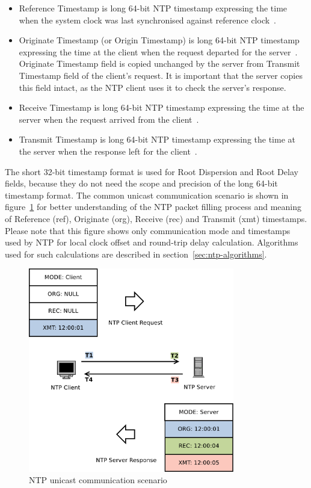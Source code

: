 \begin{itemize}
to increase its polling interval.
For stratum 1, this is a four-octet, left-justified, zero-padded ASCII
string assigned to the reference clock (e.g. "GPS" when synchronising against Global Position System clock).
Above stratum 1, this is the reference identifier of the server used for synchronisation
and can be used by the client together with stratum field to detect loops in the NTP hierarchy.
If communicating over IPv4, the identifier is IPv4 address.
If communicating over IPv6, it is the first four octets of the MD5 hash of the IPv6 address~\cite{rfc5905}.
\item
Reference Timestamp is long 64-bit NTP timestamp expressing the time
when the system clock was last synchronised against reference clock~\cite{rfc5905}.
\item
Originate Timestamp (or Origin Timestamp) is long 64-bit NTP timestamp expressing the time
at the client when the request departed for the server~\cite{rfc5905}.
Originate Timestamp field is copied
unchanged by the server from Transmit Timestamp field of the client's request.
It is important that the server copies this field intact,
as the NTP client uses it to check the server's response.
\item
Receive Timestamp is long 64-bit NTP timestamp expressing the time
at the server when the request arrived from the client~\cite{rfc5905}.
\item
Transmit Timestamp is long 64-bit NTP timestamp expressing the time
at the server when the response left for the client~\cite{rfc5905}.
\end{itemize}

The short 32-bit timestamp format is used for Root Dispersion and Root Delay fields,
because they do not need the scope and precision of the long 64-bit timestamp format.
The common unicast communication scenario is shown in figure~\ref{fig:ntp-client-server}
for better understanding of the NTP packet filling process and meaning of
Reference (ref), Originate (org), Receive (rec) and Transmit (xmt) timestamps.
Please note that this figure shows only communication mode and
timestamps used by NTP for local clock offset and round-trip delay calculation.
Algorithms used for such calculations are described in section~\ref{sec:ntp-algorithms}.

\begin{figure}
	\centering
	\includegraphics[width=9cm,keepaspectratio]{fig/ntp-client-server.pdf}
	\caption{NTP unicast communication scenario}
	\label{fig:ntp-client-server}
\end{figure}
